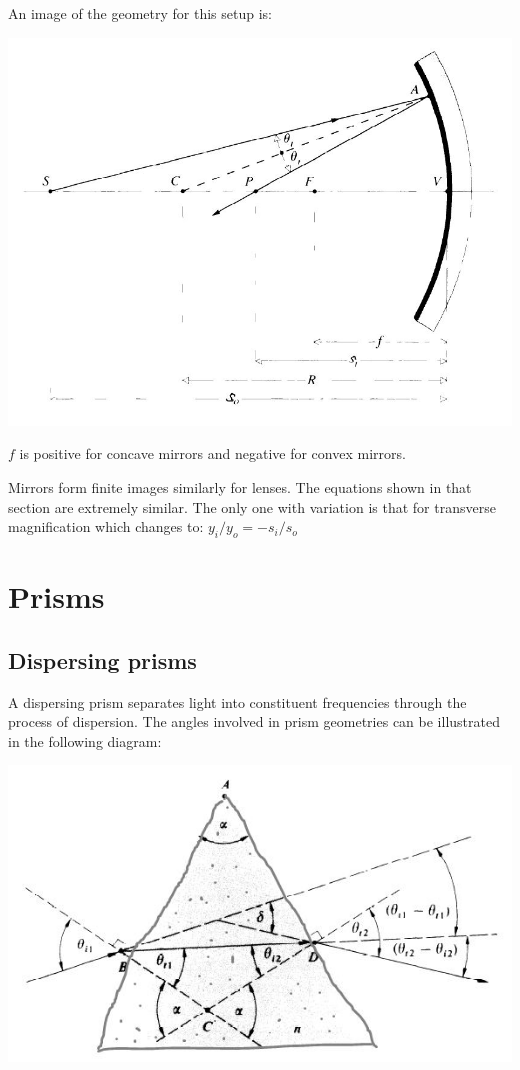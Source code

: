 \documentclass[12pt]{report}
\begin{document}
An image of the geometry for this setup is:

\includegraphics[scale=.5]{SphericalMirror.jpg}

$f$ is positive for concave mirrors and negative for convex mirrors. 

Mirrors form finite images similarly for lenses. The equations shown in that section are extremely similar. The only one with variation is that for transverse magnification which changes to: $y_i/y_o=-s_i/s_o$

\section{Prisms}
\subsection{Dispersing prisms}
A dispersing prism separates light into constituent frequencies through the process of dispersion. The angles involved in prism geometries can be illustrated in the following diagram:

\includegraphics[scale=.5]{DispersingPrism.jpg}
\end{document}
